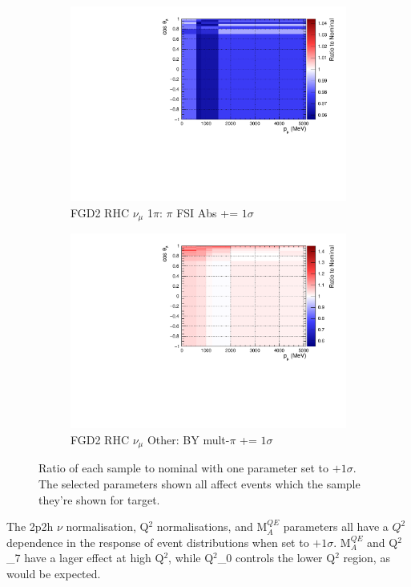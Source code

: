 \begin{figure}
\begin{subfigure}{.32\textwidth}
  \includegraphics[width=0.85\linewidth]{figs/sig/FGD2_NuMuBkg_CC1pi_in_AntiNu_Mode_FEFABS_+1sig.pdf}
  \caption{FGD2 RHC $\nu_{\mu}$ 1$\pi$: $\pi$ FSI Abs += $1\sigma$}
  \label{fig:sigvar_FGD2_NuMuBkg_CC1pi_in_AntiNu_Mode}
\end{subfigure}
\begin{subfigure}{.32\textwidth}
  \centering
  \includegraphics[width=0.85\linewidth]{figs/sig/FGD2_NuMuBkg_CCOther_in_AntiNu_Mode_CC_BY_MPi_+1sig.pdf}
  \caption{FGD2 RHC $\nu_{\mu}$ Other: BY mult-$\pi$ += $1\sigma$}
  \label{fig:sigvar_FGD2_NuMuBkg_CCOther_in_AntiNu_Mode}
\end{subfigure}
\caption{Ratio of each sample to nominal with one parameter set to $+1\sigma$. The  selected parameters shown all affect events which the sample they're shown for target.}
\label{fig:sigvars}
\end{figure}

The 2p2h $\nu$ normalisation, Q$^2$ normalisations, and M$^{QE}_A$ parameters all have a $Q^2$ dependence in the response of event distributions when set to $+1\sigma$. M$^{QE}_A$ and Q$^2$\_7 have a lager effect at high Q$^2$, while Q$^2$\_0 controls the lower Q$^2$ region, as would be expected.

